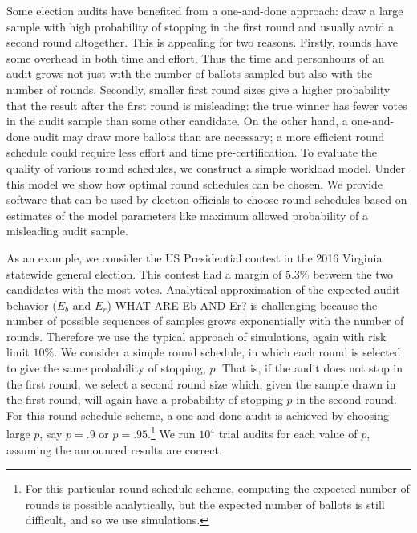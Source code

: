 Some election audits have benefited from a one-and-done approach: draw a large sample with high probability of stopping in the first round and usually avoid a second round altogether. This is appealing for two reasons. Firstly, rounds have some overhead in both time and effort. Thus the time and personhours of an audit grows not just with the number of ballots sampled but also with the number of rounds. Secondly, smaller first round sizes give a higher probability that the result after the first round is misleading: the true winner has fewer votes in the audit sample than some other candidate. On the other hand, a one-and-done audit may draw more ballots than are necessary; a more efficient round schedule could require less effort and time pre-certification. To evaluate the quality of various round schedules, we construct a simple workload model. Under this model we show how optimal round schedules can be chosen. We provide software that can be used by election officials to choose round schedules based on estimates of the model parameters like maximum allowed probability of a misleading audit sample.

As an example, we consider the US Presidential contest in the 2016 Virginia statewide general election. This contest had a margin of $5.3\%$ between the two candidates with the most votes.
Analytical approximation of the expected audit behavior ($E_b$ and $E_r$) WHAT ARE Eb AND Er? is challenging because the number of possible sequences of samples grows exponentially with the number of rounds. 
Therefore we use the typical approach of simulations, again with risk limit $10\%$.
We consider a simple round schedule, in which each round is selected to give the same probability of stopping, $p$. That is, if the audit does not stop in the first round, we select a second round size which, given the sample drawn in the first round, will again have a probability of stopping $p$ in the second round. For this round schedule scheme, a one-and-done audit is achieved by choosing large $p$, say $p=.9$ or $p=.95$.\footnote{For this particular round schedule scheme, computing the expected number of rounds is possible analytically, but the expected number of ballots is still difficult, and so we use simulations.} We run $10^4$ trial audits for each value of $p$, assuming the announced results are correct. 


